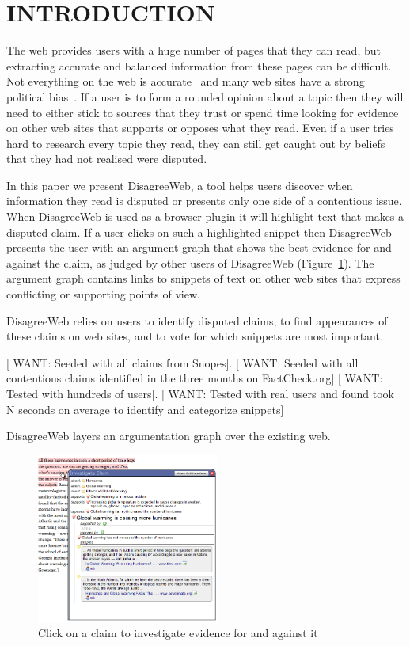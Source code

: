 \documentclass{chi2009}
\newcommand{\want}[1]{{[\color{blue} WANT: #1]}}
\begin{document}

\section{INTRODUCTION}

The web provides users with a huge number of pages that they can read, but extracting accurate and balanced information from these pages can be difficult. Not everything on the web is accurate~\cite{Mintz2002,Neumann2003,Resnik1998,Zhou2004} and many web sites have a strong political bias~\cite{Herman2002,Gentzkow2007}. If a user is to form a rounded opinion about a topic then they will need to either stick to sources that they trust or spend time looking for evidence on other web sites that supports or opposes what they read. Even if a user tries hard to research every topic they read, they can still get caught out by beliefs that they had not realised were disputed.

In this paper we present DisagreeWeb, a tool helps users discover when information they read is disputed or presents only one side of a contentious issue. When DisagreeWeb is used as a browser plugin it will highlight text that makes a disputed claim. If a user clicks on such a highlighted snippet then DisagreeWeb presents the user with an argument graph that shows the best evidence for and against the claim, as judged by other users of DisagreeWeb (Figure~\ref{claimview}). The argument graph contains links to snippets of text on other web sites that express conflicting or supporting points of view.

DisagreeWeb relies on users to identify disputed claims, to find appearances of these claims on web sites, and to vote for which snippets are most important.

\want{Seeded with all claims from Snopes}.
\want{Seeded with all contentious claims identified in the three months on FactCheck.org}
\want{Tested with hundreds of users}.
\want{Tested with real users and found took N seconds on average to identify and categorize snippets}

DisagreeWeb layers an argumentation graph over the existing web. 

\begin{figure}[tb]
	\begin{center}
	\includegraphics[width=6cm]{../screenshots/claim_popup_crop2.png}
	\caption{Click on a claim to investigate evidence for and against it}
	\label{claimview}
	\end{center}
\end{figure}
\end{document}
